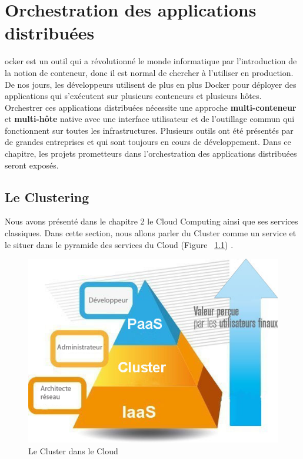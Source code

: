 \chapter{Orchestration des applications distribuées}
\begin{onehalfspace}

ocker est un outil qui a révolutionné le monde informatique par l'introduction de la notion de conteneur, donc il est normal de chercher à l'utiliser en production. De nos jours, les développeurs utilisent de plus en plus Docker pour déployer des applications qui s'exécutent sur plusieurs conteneurs et plusieurs hôtes. Orchestrer ces applications distribuées nécessite une approche \textbf{multi-conteneur} et \textbf{multi-hôte} native avec une interface utilisateur et de l'outillage commun qui fonctionnent sur toutes les infrastructures. Plusieurs outils ont été présentés par de grandes entreprises et qui sont toujours en cours de développement. Dans ce chapitre, les projets prometteurs dans l'orchestration des applications distribuées seront exposés.

\newpage

\section{Le Clustering}


Nous avons présenté dans le chapitre 2 le Cloud Computing ainsi que ses services classiques. Dans cette section, nous allons parler du Cluster comme un service et le situer dans le pyramide des services du Cloud (Figure ~\ref{fig:pyramide-cluster}) \cite{cluster}.

\begin{figure}[H]
\centering
\includegraphics [scale=0.7]{chapitre3/assets/pyramide}
\caption{Le Cluster dans le Cloud}
\label{fig:pyramide-cluster}
\end{figure}


\end{onehalfspace}
